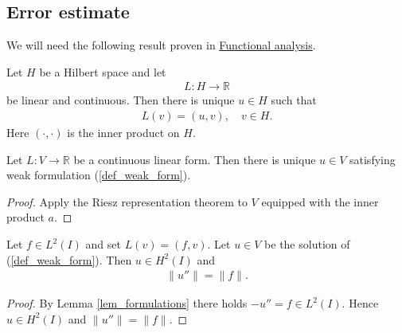 \documentclass[12pt,oneside,final]{amsart}
\def\R{\mathbb R}
\begin{document}
\subsection{Error estimate}

We will need the following result proven in \href{https://studies.helsinki.fi/courses/cu/hy-CU-117627226-2021-08-01}{Functional analysis}.

\begin{theorem}\label{th_riesz}
Let $H$ be a Hilbert space and let 
    \begin{align*}
L : H \to \R
    \end{align*}
be linear and continuous. 
Then there is unique $u \in H$ such that 
    \begin{align*}
L(v) = (u,v), \quad v \in H.
    \end{align*}
Here $(\cdot,\cdot)$ is the inner product on $H$.
\end{theorem}

\begin{corollary}
Let $L : V \to \R$ be a continuous linear form. 
Then there is unique $u \in V$ satisfying weak formulation (\ref{def_weak_form}).
\end{corollary}
\begin{proof}
Apply the Riesz representation theorem to $V$ equipped with the inner product $a$.
\end{proof}

\begin{remark}\label{rem_hreg}
Let $f \in L^2(I)$ and set $L(v) = (f, v)$.
Let $u \in V$ be the solution of (\ref{def_weak_form}).
Then $u \in H^2(I)$ and 
    \begin{align*}
\|u''\| = \|f\|.
    \end{align*}
\end{remark}
\begin{proof}
By Lemma \ref{lem_formulations} there holds $-u'' = f \in L^2(I)$. Hence $u \in H^2(I)$ and $\|u''\| = \|f\|$.
\end{proof}
\end{document}
